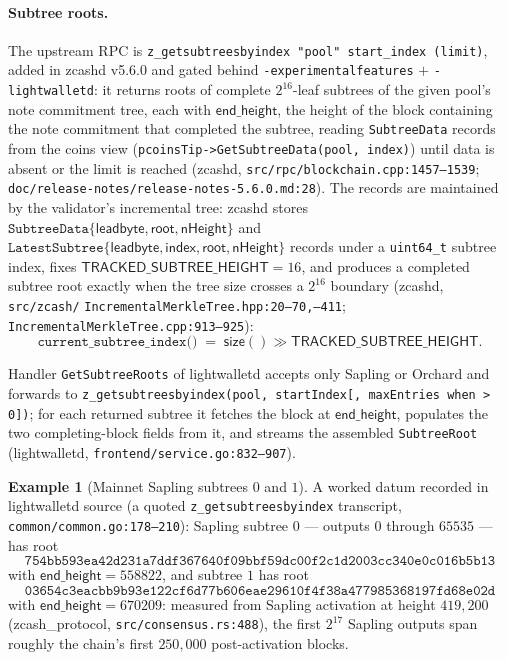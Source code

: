 \documentclass[11pt,a4paper]{article}
\theoremstyle{definition}
\newtheorem{example}[theorem]{Example}
\begin{document}
\paragraph{Subtree roots.} The upstream RPC is
\texttt{z\_getsubtreesbyindex "pool" start\_index (limit)}, added in
\textsf{zcashd} v5.6.0 and gated behind
\texttt{-experimentalfeatures} $+$ \texttt{-lightwalletd}: it returns
roots of complete $2^{16}$-leaf subtrees of the given pool's note
commitment tree, each with $\mathsf{end\_height}$, the height of the
block containing the note commitment that completed the subtree, reading
\texttt{SubtreeData} records from the coins view
(\texttt{pcoinsTip->GetSubtreeData(pool, index)}) until data is absent or
the limit is reached
(\textsf{zcashd}, \texttt{src/rpc/blockchain.cpp:1457--1539};
\texttt{doc/release-notes/}\allowbreak\texttt{release-notes-5.6.0.md:28}).
The records are
maintained by the validator's incremental tree: \textsf{zcashd} stores
$\texttt{SubtreeData}\{\mathsf{leadbyte}, \mathsf{root},
\mathsf{nHeight}\}$ and
$\texttt{LatestSubtree}\{\mathsf{leadbyte}, \mathsf{index},
\mathsf{root}, \mathsf{nHeight}\}$ records under a \texttt{uint64\_t}
subtree index, fixes $\mathsf{TRACKED\_SUBTREE\_HEIGHT} = 16$, and
produces a completed subtree root exactly when the tree size crosses a
$2^{16}$ boundary (\textsf{zcashd},
\texttt{src/zcash/}\allowbreak
\texttt{IncrementalMerkleTree.hpp:20--70,--411};
\texttt{IncrementalMerkleTree.cpp:913--925}):
\[
\texttt{current\_subtree\_index()} \;=\; \mathsf{size}() \gg
\mathsf{TRACKED\_SUBTREE\_HEIGHT}.
\]

Handler \texttt{GetSubtreeRoots} of \textsf{lightwalletd} accepts only
Sapling or Orchard and forwards to
\texttt{z\_getsubtreesbyindex(pool, startIndex[, maxEntries when > 0])};
for each returned subtree it fetches the block at
$\mathsf{end\_height}$, populates the two completing-block fields from
it, and streams the assembled \texttt{SubtreeRoot}
(\textsf{lightwalletd}, \texttt{frontend/service.go:832--907}).

\begin{example}[Mainnet Sapling subtrees $0$ and $1$]
A worked datum recorded in \textsf{lightwalletd} source (a quoted
\texttt{z\_getsubtreesbyindex} transcript,
\texttt{common/common.go:178--210}): Sapling subtree $0$ --- outputs $0$
through $65535$ --- has root
\[
\texttt{754bb593ea42d231a7ddf367640f09bbf59dc00f2c1d2003cc340e0c016b5b13}
\]
with $\mathsf{end\_height} = 558822$, and subtree $1$ has root
\[
\texttt{03654c3eacbb9b93e122cf6d77b606eae29610f4f38a477985368197fd68e02d}
\]
with $\mathsf{end\_height} = 670209$: measured from Sapling activation
at height $419{,}200$ (\textsf{zcash\_protocol},
\texttt{src/consensus.rs:488}), the first $2^{17}$ Sapling outputs
span roughly the chain's first $250{,}000$ post-activation blocks.
\end{example}
\end{document}
